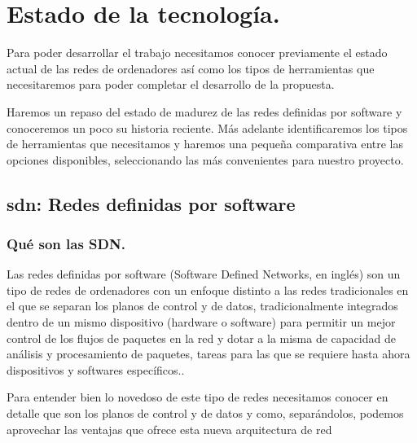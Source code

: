 \chapter{Estado de la tecnología.}

Para poder desarrollar el trabajo necesitamos conocer previamente el estado actual de las redes de ordenadores así como los tipos de herramientas que necesitaremos para poder completar el desarrollo de la propuesta.

Haremos un repaso del estado de madurez de las redes definidas por software y conoceremos un poco su historia reciente. Más adelante identificaremos los tipos de herramientas que necesitamos y haremos una pequeña comparativa entre las opciones disponibles, seleccionando las más convenientes para nuestro proyecto.


\section{\acrshort{sdn}: Redes definidas por software}

\subsection{Qué son las SDN.}

Las redes definidas por software (Software Defined Networks, en inglés) son un tipo de redes de ordenadores con un enfoque distinto a las redes tradicionales en el que se separan los planos de control y de datos, tradicionalmente integrados dentro de un mismo dispositivo (hardware o software) para permitir un mejor control de los flujos de paquetes en la red y dotar a la misma de capacidad de análisis y procesamiento de paquetes, tareas para las que se requiere hasta ahora dispositivos y softwares específicos.\cite{alma991014010918704990}.

Para entender bien lo novedoso de este tipo de redes necesitamos conocer en detalle que son los planos de control y de datos y como, separándolos, podemos aprovechar las ventajas que ofrece esta nueva arquitectura de red 

